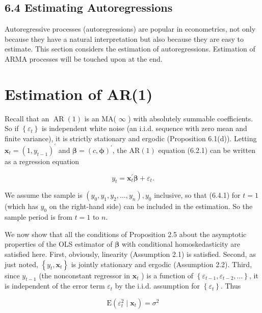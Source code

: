 \documentclass[10pt]{article}
\begin{document}
\subsection*{6.4 Estimating Autoregressions}
Autoregressive processes (autoregressions) are popular in econometrics, not only because they have a natural interpretation but also because they are easy to estimate. This section considers the estimation of autoregressions. Estimation of ARMA processes will be touched upon at the end.

\section*{Estimation of AR(1)}
Recall that an $\operatorname{AR}(1)$ is an MA( $\infty$ ) with absolutely summable coefficients. So if $\left\{\varepsilon_{t}\right\}$ is independent white noise (an i.i.d. sequence with zero mean and finite variance), it is strictly stationary and ergodic (Proposition 6.1(d)). Letting $\mathbf{x}_{t}= \left(1, y_{t-1}\right)^{\prime}$ and $\boldsymbol{\beta}=(c, \boldsymbol{\phi})^{\prime}$, the $\mathrm{AR}(1)$ equation (6.2.1) can be written as a regression equation


\begin{equation*}
y_{t}=\mathbf{x}_{t}^{\prime} \boldsymbol{\beta}+\varepsilon_{t} . \tag{6.4.1}
\end{equation*}


We assume the sample is $\left(y_{0}, y_{1}, y_{2}, \ldots, y_{n}\right), y_{0}$ inclusive, so that (6.4.1) for $t=1$ (which has $y_{0}$ on the right-hand side) can be included in the estimation. So the sample period is from $t=1$ to $n$.

We now show that all the conditions of Proposition 2.5 about the asymptotic properties of the OLS estimator of $\boldsymbol{\beta}$ with conditional homoskedasticity are satisfied here. First, obviously, linearity (Assumption 2.1) is satisfied. Second, as just noted, $\left\{y_{t}, \mathbf{x}_{t}\right\}$ is jointly stationary and ergodic (Assumption 2.2). Third, since $y_{t-1}$ (the nonconstant regressor in $\mathbf{x}_{t}$ ) is a function of $\left\{\varepsilon_{t-1}, \varepsilon_{t-2}, \ldots\right\}$, it is independent of the error term $\varepsilon_{t}$ by the i.i.d. assumption for $\left\{\varepsilon_{t}\right\}$. Thus


\begin{equation*}
\mathrm{E}\left(\varepsilon_{t}^{2} \mid \mathbf{x}_{t}\right)=\sigma^{2} \tag{6.4.2}
\end{equation*}
\end{document}
